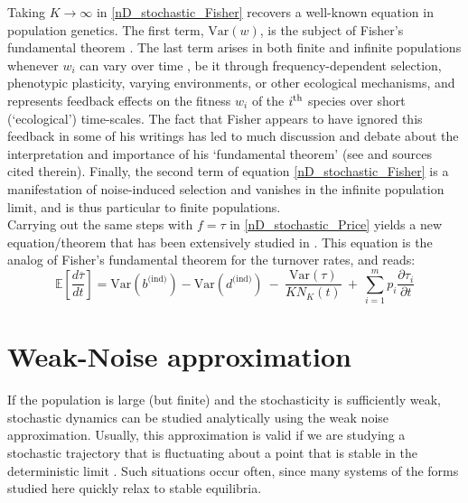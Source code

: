 Taking $K \to \infty$ in \eqref{nD_stochastic_Fisher} recovers a well-known equation in population genetics. The first term, $\textrm{Var}(w)$, is the subject of Fisher's fundamental theorem \citep{price_fishers_1972, frank_fishers_1992, kokko_stagnation_2021}. The last term arises in both finite and infinite populations whenever $w_i$ can vary over time \citep{baez_fundamental_2021, kokko_stagnation_2021}, be it through frequency-dependent selection, phenotypic plasticity, varying environments, or other ecological mechanisms, and represents feedback effects on the fitness $w_i$ of the $i\textsuperscript{th}$ species over short (`ecological') time-scales. The fact that Fisher appears to have ignored this feedback in some of his writings has led to much discussion and debate about the interpretation and importance of his `fundamental theorem' (see \cite{kokko_stagnation_2021} and sources cited therein). Finally, the second term of equation \eqref{nD_stochastic_Fisher} is a manifestation of noise-induced selection and vanishes in the infinite population limit, and is thus particular to finite populations.\\
Carrying out the same steps with $f = \tau$ in \eqref{nD_stochastic_Price} yields a new equation/theorem that has been extensively studied in \citep{kuosmanen_turnover_2022}. This equation is the analog of Fisher's fundamental theorem for the turnover rates, and reads:
\begin{equation}
\label{nD_stochastic_Fisher_turnover}
\mathbb{E}\left[\frac{d\overline{\tau}}{dt}\right] = \textrm{Var}(b^{\textrm{(ind)}}) - \textrm{Var}(d^{\textrm{(ind)}}) \ - \ \frac{\textrm{Var}(\tau)}{KN_K(t)} \ + \ \sum\limits_{i=1}^{m}p_i\frac{\partial \tau_i}{\partial t}
\end{equation}

\section{Weak-Noise approximation}
If the population is large (but finite) and the stochasticity is sufficiently weak, stochastic dynamics can be studied analytically using the weak noise approximation. Usually, this approximation is valid if we are studying a stochastic trajectory that is fluctuating about a point that is stable in the deterministic limit \citep{van_kampen_stochastic_1981}. Such situations occur often, since many systems of the forms studied here quickly relax to stable equilibria.
\clearpage

